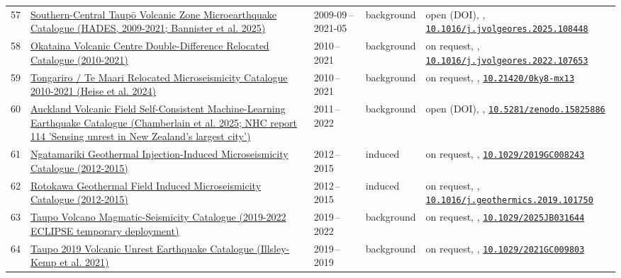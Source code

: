 \documentclass[10pt,a4paper]{article}
\begin{document}
\begin{small}
\begin{longtable}{@{}r L{4.5cm} L{1.9cm} L{1.6cm} L{5.7cm}@{}}
57 & \hyperlink{c:57}{Southern-Central Taupō Volcanic Zone Microearthquake Catalogue (HADES, 2009-2021; Bannister et al. 2025)} & 2009-09\,--\,2021-05 & background & open (DOI), \cite{Bannister2025}, {\footnotesize \href{https://doi.org/10.1016/j.jvolgeores.2025.108448}{\nolinkurl{10.1016/j.jvolgeores.2025.108448}}} \\
58 & \hyperlink{c:58}{Okataina Volcanic Centre Double-Difference Relocated Catalogue (2010-2021)} & 2010\,--\,2021 & background & on request, \cite{Bannister2022}, {\footnotesize \href{https://doi.org/10.1016/j.jvolgeores.2022.107653}{\nolinkurl{10.1016/j.jvolgeores.2022.107653}}} \\
59 & \hyperlink{c:59}{Tongariro / Te Maari Relocated Microseismicity Catalogue 2010-2021 (Heise et al. 2024)} & 2010\,--\,2021 & background & on request, \cite{Heise2024}, {\footnotesize \href{https://doi.org/10.21420/0ky8-mx13}{\nolinkurl{10.21420/0ky8-mx13}}} \\
60 & \hyperlink{c:60}{Auckland Volcanic Field Self-Consistent Machine-Learning Earthquake Catalogue (Chamberlain et al. 2025; NHC report 114 'Sensing unrest in New Zealand's largest city')} & 2011\,--\,2022 & background & open (DOI), \cite{Chamberlain2025}, {\footnotesize \href{https://doi.org/10.5281/zenodo.15825886}{\nolinkurl{10.5281/zenodo.15825886}}} \\
61 & \hyperlink{c:61}{Ngatamariki Geothermal Injection-Induced Microseismicity Catalogue (2012-2015)} & 2012\,--\,2015 & induced & on request, \cite{Hopp2019}, {\footnotesize \href{https://doi.org/10.1029/2019GC008243}{\nolinkurl{10.1029/2019GC008243}}} \\
62 & \hyperlink{c:62}{Rotokawa Geothermal Field Induced Microseismicity Catalogue (2012-2015)} & 2012\,--\,2015 & induced & on request, \cite{Hopp2020}, {\footnotesize \href{https://doi.org/10.1016/j.geothermics.2019.101750}{\nolinkurl{10.1016/j.geothermics.2019.101750}}} \\
63 & \hyperlink{c:63}{Taupo Volcano Magmatic-Seismicity Catalogue (2019-2022 ECLIPSE temporary deployment)} & 2019\,--\,2022 & background & on request, \cite{Mestel2025}, {\footnotesize \href{https://doi.org/10.1029/2025JB031644}{\nolinkurl{10.1029/2025JB031644}}} \\
64 & \hyperlink{c:64}{Taupo 2019 Volcanic Unrest Earthquake Catalogue (Illsley-Kemp et al. 2021)} & 2019\,--\,2019 & background & on request, \cite{IllsleyKemp2021}, {\footnotesize \href{https://doi.org/10.1029/2021GC009803}{\nolinkurl{10.1029/2021GC009803}}} \\

\end{longtable}
\end{small}
\end{document}
